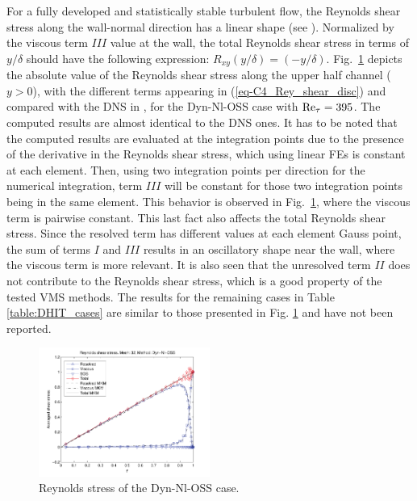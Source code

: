 For a fully developed and statistically stable turbulent flow, the Reynolds shear stress along the wall-normal direction has a linear shape  (see \cite{kim_turbulence_1987}). Normalized by the viscous term $III$ value at the wall, the total Reynolds shear stress in terms of $y/	\delta$ should have the following expression: $R_{xy}(y/\delta)=(-y/\delta)$. Fig.~\ref{fig:OSS_dyn_Nl_reystr} depicts the absolute value of the Reynolds shear stress along the upper half channel ($y>0$), with the different terms appearing in (\ref{eq-C4_Rey_shear_disc}) and compared with the DNS in \cite{moser_direct_1999}, for the Dyn-Nl-OSS case with ${\rm Re}_\tau=395$. The computed results are almost identical to the DNS ones. It has to be noted that the computed results are evaluated at the integration points due to the presence of the derivative in the Reynolds shear stress, which using linear FEs is constant at each element. Then, using two integration points per direction for the numerical integration, term $III$ will be constant for those two integration points being in the same element. This behavior is observed in Fig.~\ref{fig:OSS_dyn_Nl_reystr}, where the viscous term is pairwise constant. This last fact also affects the total Reynolds shear stress. Since the resolved term has different values at each element Gauss point, the sum of terms $I$ and $III$ results in an oscillatory shape near the wall, where the viscous term is more relevant. It is also seen that the unresolved term $II$ does not contribute to the Reynolds shear stress, which is a good property of the tested VMS methods. The results for the remaining cases in Table \ref{table:DHIT_cases} are similar to those presented in Fig. \ref{fig:OSS_dyn_Nl_reystr} and have not been reported. 
\begin{figure}[h!]
	\centering	
	\includegraphics[width=0.5\textwidth]{Figures/Chapter4/CF/reystr_395_Dyn_Nl_OSS}
	\caption{Reynolds stress of the Dyn-Nl-OSS case.}
	\label{fig:OSS_dyn_Nl_reystr}
\end{figure}

